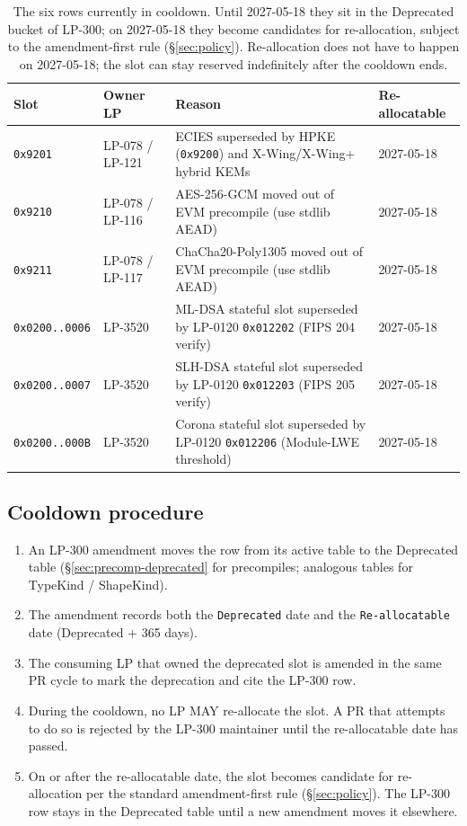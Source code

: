 \begin{table}[h]
\centering
\small
\begin{tabular}{@{}p{2.6cm}p{2.4cm}p{6.0cm}p{2.0cm}@{}}
\toprule
\textbf{Slot} & \textbf{Owner LP} & \textbf{Reason} & \textbf{Re-allocatable} \\
\midrule
\texttt{0x9201} & LP-078 / LP-121 & ECIES superseded by HPKE (\texttt{0x9200}) and X-Wing/X-Wing+ hybrid KEMs & 2027-05-18 \\
\texttt{0x9210} & LP-078 / LP-116 & AES-256-GCM moved out of EVM precompile (use stdlib AEAD) & 2027-05-18 \\
\texttt{0x9211} & LP-078 / LP-117 & ChaCha20-Poly1305 moved out of EVM precompile (use stdlib AEAD) & 2027-05-18 \\
\texttt{0x0200..0006} & LP-3520 & ML-DSA stateful slot superseded by LP-0120 \texttt{0x012202} (FIPS 204 verify) & 2027-05-18 \\
\texttt{0x0200..0007} & LP-3520 & SLH-DSA stateful slot superseded by LP-0120 \texttt{0x012203} (FIPS 205 verify) & 2027-05-18 \\
\texttt{0x0200..000B} & LP-3520 & Corona stateful slot superseded by LP-0120 \texttt{0x012206} (Module-LWE threshold) & 2027-05-18 \\
\bottomrule
\end{tabular}
\caption{The six rows currently in cooldown. Until 2027-05-18 they
sit in the Deprecated bucket of LP-300; on 2027-05-18 they become
candidates for re-allocation, subject to the amendment-first rule
(\S\ref{sec:policy}). Re-allocation does not have to happen on
2027-05-18; the slot can stay reserved indefinitely after the
cooldown ends.}
\label{tab:cooldown-ledger}
\end{table}

\subsection{Cooldown procedure}

\begin{enumerate}[leftmargin=2em,nosep]
\item An LP-300 amendment moves the row from its active table to the
  Deprecated table (\S\ref{sec:precomp-deprecated} for precompiles;
  analogous tables for TypeKind / ShapeKind).
\item The amendment records both the \texttt{Deprecated} date and
  the \texttt{Re-allocatable} date (Deprecated + 365 days).
\item The consuming LP that owned the deprecated slot is amended in
  the same PR cycle to mark the deprecation and cite the LP-300 row.
\item During the cooldown, no LP MAY re-allocate the slot. A PR that
  attempts to do so is rejected by the LP-300 maintainer until the
  re-allocatable date has passed.
\item On or after the re-allocatable date, the slot becomes
  candidate for re-allocation per the standard amendment-first rule
  (\S\ref{sec:policy}). The LP-300 row stays in the Deprecated table
  until a new amendment moves it elsewhere.
\end{enumerate}

